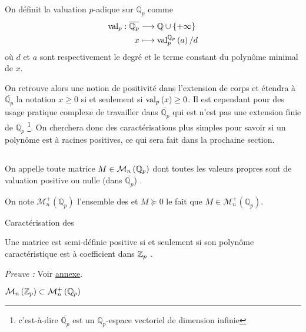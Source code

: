 \begin{definition}
	On définit la valuation $p$-adique sur $\overline{\mathbb{Q}_{p} }$ comme 
\begin{align*}
	\text{val}_p : \overline{\mathbb{Q}_{p}} & \longrightarrow \mathbb{Q}\cup \{+\infty\} \\
x & \longmapsto \text{val}_p^{\mathbb{Q}_{p} } \left(a\right)/d
\end{align*}
	où $d$ et $a$ sont respectivement le degré et le terme constant du polynôme minimal de $x$.
\end{definition}

On retrouve alors une notion de positivité dans l'extension de corps et étendra à $\overline{\mathbb{Q}_{p}} $ la notation $x\ge 0$ si et seulement si $\text{val}_p\left(x\right)\ge 0$. Il est cependant pour des usage pratique complexe de travailler dans $\overline{\mathbb{Q}_{p} }$ qui est n'est pas une extension finie de $\mathbb{Q}_{p} $ \footnote{c'est-à-dire $\overline{\mathbb{Q}_{p} }$ est un $\mathbb{Q}_{p}$-espace vectoriel de dimension infinie }. On cherchera donc des caractérisations plus simples pour savoir si un polynôme est à racines positives, ce qui sera fait dans la prochaine section.

\subsection{\Mats} 

\begin{definition}
	On appelle \emp{\mat} toute matrice $M \in \mathcal{M}_n\left( \mathbb{Q}_p \right) $ dont toutes les valeurs propres sont de valuation positive ou nulle (dans $\overline{\mathbb{Q}_{p}}$) .

	On note $ \mathcal{M}_n^+\left( \mathbb{Q}_p \right)$ l'ensemble des \mats et $M \succeq 0$ le fait que $M \in \mathcal{M}_n^+\left( \mathbb{Q}_{p}\right) $.
\end{definition}
\begin{theoreme}
	\label{caracsdp}
	Caractérisation des \mats

	Une matrice est semi-définie positive si et seulement si son polynôme caractéristique est à coefficient dans $ \mathbb {Z}_p $ .
	
\end{theoreme}
	\textit{Preuve :} Voir \hyperlink{caracsdppreuve}{annexe}.  

\begin{consequence}
	$\mathcal{M}_n \left(  \mathbb {Z}_p  \right) \subset \mathcal{M}_n^+\left( \mathbb{Q}_p \right)$ 
\end{consequence}

